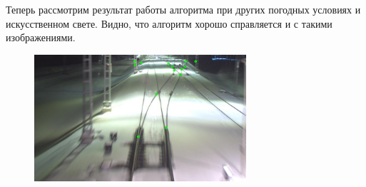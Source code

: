 Теперь рассмотрим результат работы алгоритма при других погодных условиях и искусственном свете. Видно, что алгоритм хорошо справляется и с такими изображениями.
\begin{figure}[!h]
	\centering
	\includegraphics[width=0.7\textwidth]{pictures/res3.png}
	\caption{}
	\label{fig:res3}
\end{figure}

